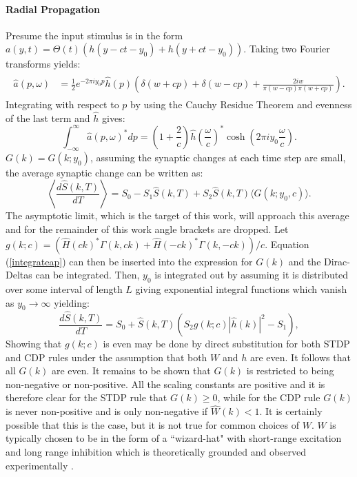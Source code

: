 \paragraph{Radial Propagation}
Presume the input stimulus is in the form $a(y,t) = \Theta(t) (h(y-ct-y_0)+h(y+ct-y_0))$. Taking two Fourier transforms yields:
\begin{align} 
	\begin{split}
		\hat{a}(p,\omega)& = \frac{1}{2} e^{-2\pi i y_0 p}\hat{h}(p) \left( \delta (w+cp) + \delta (w-cp) + \frac{2iw}{\pi (w-cp)\pi (w+cp)}\right).
	\end{split}
\end{align}
Integrating with respect to $p$ by using the Cauchy Residue Theorem and evenness of the last term and $\hat{h}$ gives:
\begin{equation} 
	\label{integrateap}
	\int_{-\infty}^{\infty}\hat{a}(p,\omega)^*dp = \left(1 + \frac{2}{c} \right) \hat{h}\left(\frac{\omega}{c}\right)^* \cosh\left(2\pi i y_0 \frac{\omega}{c}\right).
\end{equation}
$G(k)=G(k; y_0)$, assuming the synaptic changes at each time step are small, the average synaptic change can be written as:
\begin{equation}
	\left \langle \frac{d\hat{S}(k,T)}{dT} \right \rangle = S_0 - S_1\hat{S}(k,T) + S_2 \hat{S}(k,T) \langle G(k; y_0, c) \rangle. 
\end{equation}
The asymptotic limit, which is the target of this work, will approach this average and for the remainder of this work angle brackets are dropped. Let $g(k;c) = (\hat{H}(ck)^* \Gamma(k,ck)+\hat{H}(-ck)^* \Gamma(k,-ck))/c$. Equation (\ref{integrateap}) can then be inserted into the expression for $G(k)$ and the Dirac-Deltas can be integrated. Then, $y_0$ is integrated out by assuming it is distributed over some interval of length $L$ giving exponential integral functions which vanish as $y_0 \rightarrow \infty$ yielding:
\begin{equation}
	\frac{d\hat{S}(k,T)}{dT} = S_0 + \hat{S}(k,T)\left(S_2 g(k;c) |\hat{h}(k)|^2 - S_1 \right), \label{eq:finalsyn} 
\end{equation}
Showing that $g(k;c)$ is even may be done by direct substitution for both STDP and CDP rules under the assumption that both $W$ and $h$ are even. It follows that all $G(k)$ are even. It remains to be shown that $G(k)$ is restricted to being non-negative or non-positive. All the scaling constants are positive and it is therefore clear for the STDP rule that $G(k)\geq 0$, while for the CDP rule $G(k)$ is never non-positive and is only non-negative if $\hat{W}(k)<1$. It is certainly possible that this is the case, but it is not true for common choices of $W$. $W$ is typically chosen to be in the form of a ``wizard-hat" with short-range excitation and long range inhibition which is theoretically grounded and observed experimentally \cite{Sirosh1994-zv, Phongphanphanee2014-in}.
